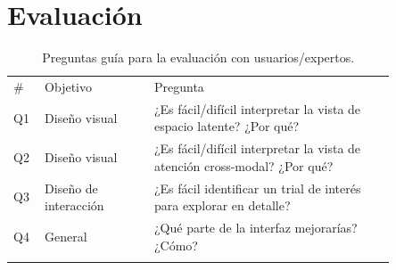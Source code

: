 \section{Evaluación}\label{sec:evaluation}


\begin{table}[tb]
\centering
\caption{Preguntas guía para la evaluación con usuarios/expertos.}
\label{table:eval_questions}
{%
\begin{tabular}{@{}p{0.05\linewidth}p{0.25\linewidth}p{0.55\linewidth}@{}}\toprule
\# & Objetivo & Pregunta \\\colrule
Q1 & Diseño visual & ¿Es fácil/difícil interpretar la vista de espacio latente? ¿Por qué? \\
Q2 & Diseño visual & ¿Es fácil/difícil interpretar la vista de atención cross-modal? ¿Por qué? \\
Q3 & Diseño de interacción & ¿Es fácil identificar un trial de interés para explorar en detalle? \\
Q4 & General & ¿Qué parte de la interfaz mejorarías? ¿Cómo? \\
\botrule
\end{tabular}}
\end{table}